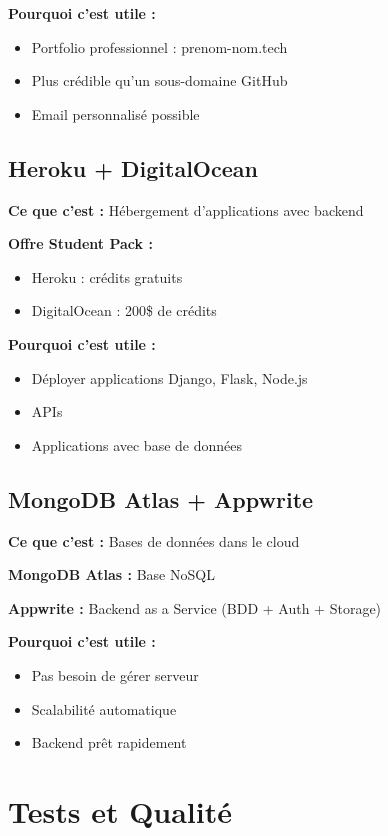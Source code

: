 \documentclass[11pt,a4paper]{article}
\begin{document}
\textbf{Pourquoi c'est utile :}
\begin{itemize}
    \item Portfolio professionnel : prenom-nom.tech
    \item Plus crédible qu'un sous-domaine GitHub
    \item Email personnalisé possible
\end{itemize}

\subsection{Heroku + DigitalOcean}

\textbf{Ce que c'est :} Hébergement d'applications avec backend

\textbf{Offre Student Pack :}
\begin{itemize}
    \item Heroku : crédits gratuits
    \item DigitalOcean : 200\$ de crédits
\end{itemize}

\textbf{Pourquoi c'est utile :}
\begin{itemize}
    \item Déployer applications Django, Flask, Node.js
    \item APIs
    \item Applications avec base de données
\end{itemize}

\subsection{MongoDB Atlas + Appwrite}

\textbf{Ce que c'est :} Bases de données dans le cloud

\textbf{MongoDB Atlas :} Base NoSQL

\textbf{Appwrite :} Backend as a Service (BDD + Auth + Storage)

\textbf{Pourquoi c'est utile :}
\begin{itemize}
    \item Pas besoin de gérer serveur
    \item Scalabilité automatique
    \item Backend prêt rapidement
\end{itemize}

\newpage
\section{Tests et Qualité}
\end{document}
